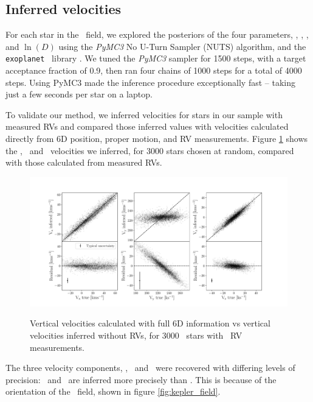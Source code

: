 
\subsection{Inferred velocities}

For each star in the \kepler\ field, we explored the posteriors of the four
parameters, \vx, \vy, \vz, and $\ln(D)$ using the {\it PyMC3} No U-Turn
Sampler (NUTS) algorithm, and the {\tt exoplanet} \python\ library
.
We tuned the {\it PyMC3} sampler for 1500 steps, with a target acceptance
fraction of 0.9, then ran four chains of 1000 steps for a total of 4000 steps.
Using PyMC3 made the inference procedure exceptionally fast -- taking just a
few seconds per star on a laptop.

To validate our method, we inferred velocities for stars in our sample with
measured RVs and compared those inferred values with velocities calculated
directly from 6D position, proper motion, and RV measurements.
Figure \ref{fig:residuals} shows the \vx, \vy\ and \vz\ velocities we
inferred, for 3000 stars chosen at random, compared with those calculated from
measured RVs.
\begin{figure}[ht!]
\caption{Vertical velocities calculated with full 6D information vs vertical
    velocities inferred without RVs, for 3000 \mct\ stars with \gaia\ RV
    measurements.}
  \centering
    \includegraphics[width=1\textwidth]{residuals}
\label{fig:residuals}
\end{figure}

The three velocity components, \vx, \vy\ and \vz\ were recovered with
differing levels of precision: \vx\ and \vz\ are inferred more precisely than
\vy.
This is because of the orientation of the \kepler\ field, shown in figure
\ref{fig:kepler_field}.

